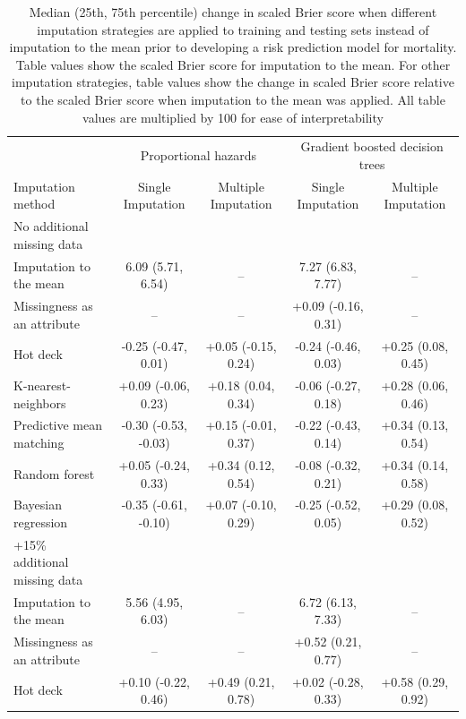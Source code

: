 \documentclass{article}
\begin{document}
\clearpage

\begin{table} 
 \caption{Median (25th, 75th percentile) change in scaled Brier score when different imputation strategies are applied to training and testing sets instead of imputation to the mean prior to developing a risk prediction model for mortality. Table values show the scaled Brier score for imputation to the mean. For other imputation strategies, table values show the change in scaled Brier score relative to the scaled Brier score when imputation to the mean was applied. All table values are multiplied by 100 for ease of interpretability} 
\label{tbl_md_strat_dead_ipa} 
 
\begin{tabular}{lcccc}
\toprule
& \multicolumn{2}{c}{Proportional hazards} & \multicolumn{2}{c}{Gradient boosted decision trees} \\ 
 \cmidrule(lr){2-3}\cmidrule(lr){4-5}
Imputation method & Single Imputation & Multiple Imputation & Single Imputation & Multiple Imputation \\ 
\midrule
\multicolumn{1}{l}{No additional missing data} \\ 
\midrule
Imputation to the mean & 6.09 (5.71, 6.54) & -- & 7.27 (6.83, 7.77) & -- \\ 
Missingness as an attribute & -- & -- & +0.09 (-0.16, 0.31) & -- \\ 
Hot deck & -0.25 (-0.47, 0.01) & +0.05 (-0.15, 0.24) & -0.24 (-0.46, 0.03) & +0.25 (0.08, 0.45) \\ 
K-nearest-neighbors & +0.09 (-0.06, 0.23) & +0.18 (0.04, 0.34) & -0.06 (-0.27, 0.18) & +0.28 (0.06, 0.46) \\ 
Predictive mean matching & -0.30 (-0.53, -0.03) & +0.15 (-0.01, 0.37) & -0.22 (-0.43, 0.14) & +0.34 (0.13, 0.54) \\ 
Random forest & +0.05 (-0.24, 0.33) & +0.34 (0.12, 0.54) & -0.08 (-0.32, 0.21) & +0.34 (0.14, 0.58) \\ 
Bayesian regression & -0.35 (-0.61, -0.10) & +0.07 (-0.10, 0.29) & -0.25 (-0.52, 0.05) & +0.29 (0.08, 0.52) \\ 
\midrule
\multicolumn{1}{l}{+15\% additional missing data} \\ 
\midrule
Imputation to the mean & 5.56 (4.95, 6.03) & -- & 6.72 (6.13, 7.33) & -- \\ 
Missingness as an attribute & -- & -- & +0.52 (0.21, 0.77) & -- \\ 
Hot deck & +0.10 (-0.22, 0.46) & +0.49 (0.21, 0.78) & +0.02 (-0.28, 0.33) & +0.58 (0.29, 0.92) \\ 

\end{tabular}
\end{table}
\end{document}
